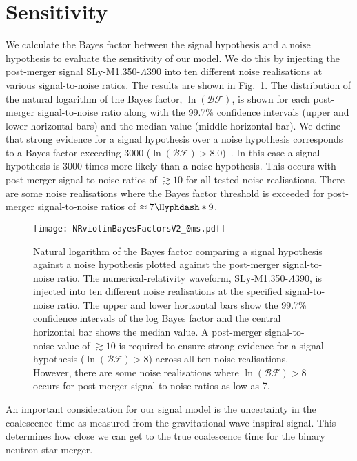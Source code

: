 \documentclass[../Thesis.tex]{subfiles}
\begin{document}
\section{Sensitivity}\label{sec:sensitivity2}
    We calculate the Bayes factor between the signal hypothesis and a noise hypothesis to evaluate the sensitivity of our model. 
    We do this by injecting  the post-merger signal SLy-M1.350-$\Lambda$390 into ten different noise realisations at various signal-to-noise ratios. 
    The results are shown in Fig.~\ref{fig:BFvsSNR}.
    The distribution of the natural logarithm of the Bayes factor, $\ln(\mathcal{BF})$, is shown for each post-merger signal-to-noise ratio along with the 99.7\% confidence intervals (upper and lower horizontal bars) and the median value (middle horizontal bar). 
    We define that strong evidence for a signal hypothesis over a noise hypothesis corresponds to a Bayes factor exceeding 3000 ($\ln(\mathcal{BF})> 8.0$)~\cite[e.g.,][]{Jeffreys61}. 
    In this case a signal hypothesis is 3000 times more likely than a noise hypothesis.
    This occurs with post-merger signal-to-noise ratios of $\gtrsim 10$ for all tested noise realisations.
    There are some noise realisations where the Bayes factor threshold is exceeded for post-merger signal-to-noise ratios of $\approx 7\Hyphdash*9$.\par
    \begin{figure}[H]
         \centering
         \texttt{[image: NRviolinBayesFactorsV2\_0ms.pdf]}
         \caption{Natural logarithm of the Bayes factor comparing a signal hypothesis against a noise hypothesis plotted against the post-merger signal-to-noise ratio.
         The numerical-relativity waveform, SLy-M1.350-$\Lambda$390, is injected into ten different noise realisations at the specified signal-to-noise ratio.  
         The upper and lower horizontal bars show the 99.7\% confidence intervals of the log Bayes factor and the central horizontal bar shows the median value. 
         A post-merger signal-to-noise value of $\gtrsim 10$ is required to ensure strong evidence for a signal hypothesis ($\ln(\mathcal{BF})>8$) across all ten noise realisations. However, there are some noise realisations where $\ln(\mathcal{BF})>8$ occurs for post-merger signal-to-noise ratios as low as 7.}
         \label{fig:BFvsSNR}
     \end{figure}  
     An important consideration for our signal model is the uncertainty in the coalescence time as measured from the gravitational-wave inspiral signal. 
     This determines how close we can get to the true coalescence time for the binary neutron star merger.
\end{document}
